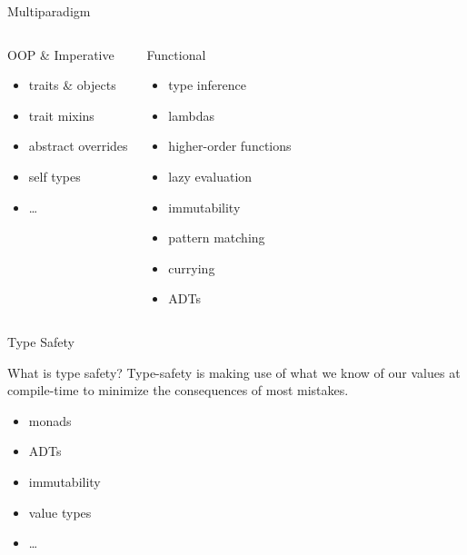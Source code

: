 \documentclass[aspectratio=169]{beamer}
\begin{document}
\begin{frame}{Multiparadigm}
  \vspace*{-8pt}
  \begin{columns}[T]
    \pause
    \begin{block}{OOP \& Imperative}
      \vspace*{-10pt}
      \begin{itemize}
        \item traits \& objects
        \item trait mixins
        \item abstract overrides
        \item self types
        \item \ldots
      \end{itemize}
    \end{block}
    \pause
    \begin{block}{Functional}
      \vspace*{-10pt}
      \begin{itemize}
        \item type inference
        \item lambdas
        \item higher-order functions
        \item lazy evaluation
        \item immutability
        \item pattern matching
        \item currying
        \item ADTs
      \end{itemize}
    \end{block}
  \end{columns}
\end{frame}

\begin{frame}{Type Safety}
  \begin{block}{What is type safety?}
    Type-safety is making use of what we know of our values at compile-time to minimize the
    consequences of most mistakes.
  \end{block}
  \pause
  \begin{itemize}
    \item monads
    \item ADTs
    \item immutability
    \item value types
    \item \ldots
  \end{itemize}
\end{frame}
\end{document}
